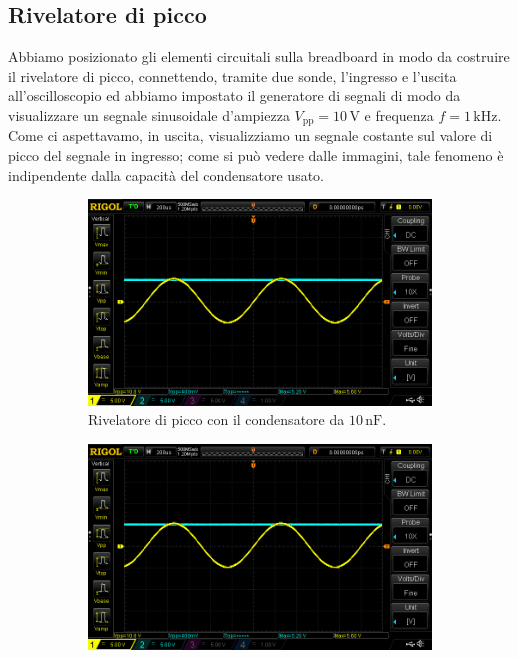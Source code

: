\documentclass[a4paper]{article}
\begin{document}
		\subsection{Rivelatore di picco}
			Abbiamo posizionato gli elementi circuitali sulla breadboard in modo da costruire il rivelatore di picco, connettendo, tramite due sonde, l'ingresso e l'uscita all'oscilloscopio ed abbiamo impostato il generatore di segnali di modo da visualizzare un segnale sinusoidale d'ampiezza $ V_{\mathrm{pp}} = 10 \, \mathrm{V} $ e frequenza $ f = 1 \, \mathrm{kHz} $.
			\newline
			Come ci aspettavamo, in uscita, visualizziamo un segnale costante sul valore di picco del segnale in ingresso; come si può vedere dalle immagini, tale fenomeno è indipendente dalla capacità del condensatore usato.
			\begin{figure}[h!]
				\centering
				\begin{subfigure}{0.4\textwidth}
					\centering
					\includegraphics[scale=0.2]{rivelatoreDiPicco10n}
					\caption{Rivelatore di picco con il condensatore da $ 10 \, \mathrm{nF} $.}
				\end{subfigure}
				\begin{subfigure}{0.4\textwidth}
					\centering
					\includegraphics[scale=0.2]{rivelatoreDiPicco100n}

\end{subfigure}
\end{figure}
\end{document}
